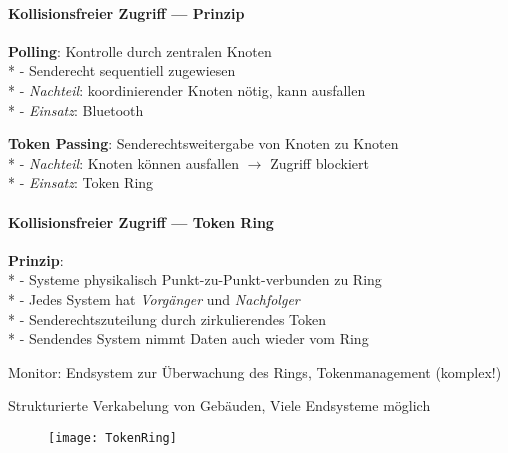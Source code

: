 \newpage

\paragraph{Kollisionsfreier Zugriff --- Prinzip}
\begin{items}
  \item \textbf{Polling}: Kontrolle durch zentralen Knoten \\*
    - Senderecht sequentiell zugewiesen \\*
    - \emph{Nachteil}: koordinierender Knoten nötig, kann ausfallen \\*
    - \emph{Einsatz}: Bluetooth
  \item \textbf{Token Passing}: Senderechtsweitergabe von Knoten zu Knoten \\*
    - \emph{Nachteil}: Knoten können ausfallen \( \to \) Zugriff blockiert \\*
    - \emph{Einsatz}: Token Ring
\end{items}

\paragraph{Kollisionsfreier Zugriff --- Token Ring}
\begin{items}
  \item \textbf{Prinzip}: \\*
    - Systeme physikalisch Punkt-zu-Punkt-verbunden zu Ring \\*
    - Jedes System hat \emph{Vorgänger} und \emph{Nachfolger} \\*
    - Senderechtszuteilung durch zirkulierendes Token\\*
    - Sendendes System nimmt Daten auch wieder vom Ring
    \item Monitor: Endsystem zur Überwachung des Rings, Tokenmanagement (komplex!)
    \item Strukturierte Verkabelung von Gebäuden, Viele Endsysteme möglich
\end{items}
\begin{figure}[H]\centering\label{TokenRing}\texttt{[image: TokenRing]}\end{figure}

